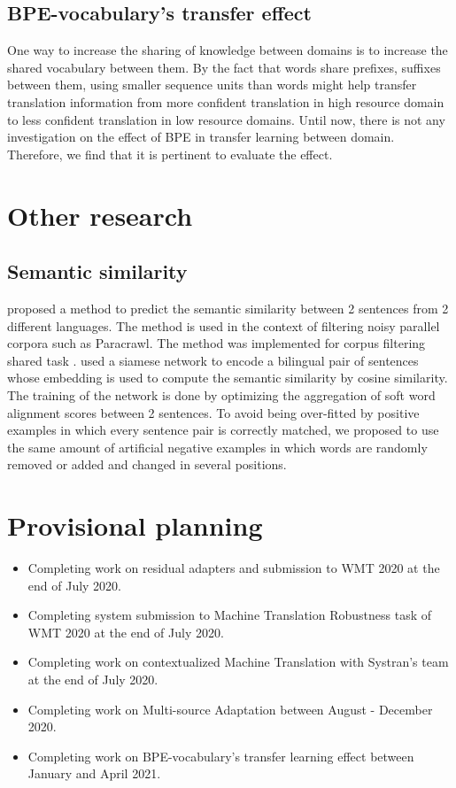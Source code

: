 \documentclass[12pt,a4paper,twoside]{report}
\theoremstyle{definition}
\begin{document}
\subsection*{BPE-vocabulary's transfer effect}
One way to increase the sharing of knowledge between domains is to increase the shared vocabulary between them. By the fact that words share prefixes, suffixes between them, using smaller sequence units than words might help transfer translation information from more confident translation in high resource domain to less confident translation in low resource domains. Until now, there is not any investigation on the effect of BPE in transfer learning between domain. Therefore, we find that it is pertinent to evaluate the effect.

\section*{Other research}
\subsection*{Semantic similarity}
\cite{pham18fixing} proposed a method to predict the semantic similarity between 2 sentences from 2 different languages. The method is used in the context of filtering noisy parallel corpora such as Paracrawl. The method was implemented for corpus filtering shared task  \cite{koehn18findings}. \cite{pham18fixing} used a siamese network to encode a bilingual pair of sentences whose embedding is used to compute the semantic similarity by cosine similarity. The training of the network is done by optimizing the aggregation of soft word alignment scores between 2 sentences. To avoid being over-fitted by positive examples in which every sentence pair is correctly matched, we proposed to use the same amount of artificial negative examples in which words are randomly removed or added and changed in several positions.
\section*{Provisional planning}
\begin{itemize}
	\item Completing work on residual adapters and submission to WMT 2020 at the end of July 2020.
	\item Completing system submission to Machine Translation Robustness task of WMT 2020 at the end of July 2020.
	\item Completing work on contextualized Machine Translation with Systran's team at the end of July 2020.
	\item Completing work on Multi-source Adaptation between August - December 2020.
	\item Completing work on BPE-vocabulary's transfer learning effect between January and April 2021.
\end{itemize}


\end{document}
